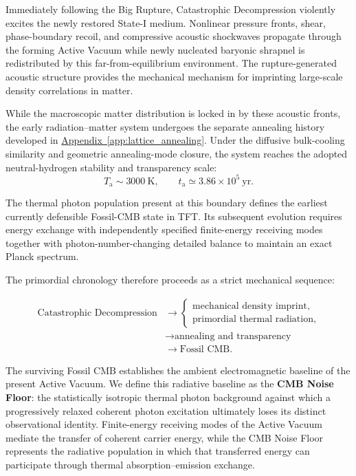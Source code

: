 Immediately following the Big Rupture, Catastrophic Decompression violently excites the newly restored State-I medium. Nonlinear pressure fronts, shear, phase-boundary recoil, and compressive acoustic shockwaves propagate through the forming Active Vacuum while newly nucleated baryonic shrapnel is redistributed by this far-from-equilibrium environment. The rupture-generated acoustic structure provides the mechanical mechanism for imprinting large-scale density correlations in matter.

While the macroscopic matter distribution is locked in by these acoustic fronts, the early radiation--matter system undergoes the separate annealing history developed in \hyperref[app:lattice_annealing]{Appendix~\ref*{app:lattice_annealing}}. Under the diffusive bulk-cooling similarity and geometric annealing-mode closure, the system reaches the adopted neutral-hydrogen stability and transparency scale:
\begin{equation}
    T_{\mathrm a} \sim 3000\ \mathrm K, \qquad t_{\mathrm a} \simeq 3.86\times10^5\ \mathrm{yr}.
\end{equation}

The thermal photon population present at this boundary defines the earliest currently defensible Fossil-CMB state in TFT. Its subsequent evolution requires energy exchange with independently specified finite-energy receiving modes together with photon-number-changing detailed balance to maintain an exact Planck spectrum.

The primordial chronology therefore proceeds as a strict mechanical sequence:

\begin{equation}
\begin{aligned}
    \text{Catastrophic Decompression}
    &\longrightarrow
    \begin{cases}
        \text{mechanical density imprint},\\
        \text{primordial thermal radiation},
    \end{cases}
    \\
    &\longrightarrow
    \text{annealing and transparency}
    \\
    &\longrightarrow
    \text{Fossil CMB}.
\end{aligned}
\end{equation}

The surviving Fossil CMB establishes the ambient electromagnetic baseline of the present Active Vacuum. We define this radiative baseline as the \textbf{CMB Noise Floor}: the statistically isotropic thermal photon background against which a progressively relaxed coherent photon excitation ultimately loses its distinct observational identity. Finite-energy receiving modes of the Active Vacuum mediate the transfer of coherent carrier energy, while the CMB Noise Floor represents the radiative population in which that transferred energy can participate through thermal absorption--emission exchange.

